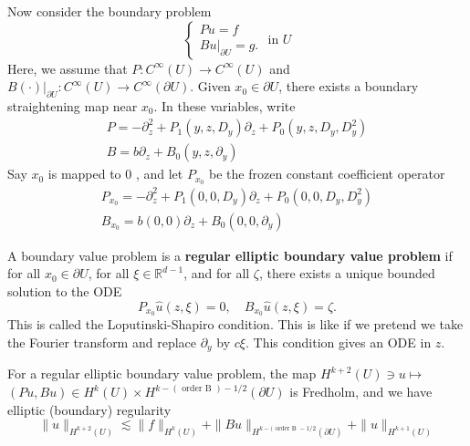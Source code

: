 Now consider the boundary problem
$$
\left\{\begin{array}{l}
P u=f \\
\left.B u\right|_{\partial U}=g .
\end{array} \text { in } U\right.
$$
Here, we assume that $P: C^{\infty}(U) \rightarrow C^{\infty}(U)$ and $\left.B(\cdot)\right|_{\partial U}: C^{\infty}(U) \rightarrow C^{\infty}(\partial U)$. Given $x_{0} \in \partial U$, there exists a boundary straightening map near $x_{0}$. In these variables, write
$$
\begin{gathered}
P=-\partial_{z}^{2}+P_{1}\left(y, z, D_{y}\right) \partial_{z}+P_{0}\left(y, z, D_{y}, D_{y}^{2}\right) \\
B=b \partial_{z}+B_{0}\left(y, z, \partial_{y}\right)
\end{gathered}
$$
Say $x_{0}$ is mapped to 0 , and let $P_{x_{0}}$ be the frozen constant coefficient operator
$$
\begin{gathered}
P_{x_{0}}=-\partial_{z}^{2}+P_{1}\left(0,0, D_{y}\right) \partial_{z}+P_{0}\left(0,0, D_{y}, D_{y}^{2}\right) \\
B_{x_{0}}=b(0,0) \partial_{z}+B_{0}\left(0,0, \partial_{y}\right)
\end{gathered}
$$


\begin{definition}
\label{def: Loputinski-Shapiro}
A boundary value problem is a\textbf{ regular elliptic boundary value problem} if for all $x_{0} \in \partial U$, for all $\xi \in \mathbb{R}^{d-1}$, and for all $\zeta$, there exists a unique bounded solution to the ODE
$$
P_{x_{0}} \widehat{u}(z, \xi)=0, \quad B_{x_{0}} \widehat{u}(z, \xi)=\zeta .
$$
This is called the Loputinski-Shapiro condition. This is like if we pretend we take the Fourier transform and replace $\partial_{y}$ by $c \xi$. This condition gives an ODE in $z$.
\end{definition}


\begin{theorem}
For a regular elliptic boundary value problem, the map $H^{k+2}(U) \ni u \mapsto$ $(P u, B u) \in H^{k}(U) \times H^{k-(\text { order B })-1 / 2}(\partial U)$ is Fredholm, and we have elliptic (boundary) regularity
$$
\|u\|_{H^{k+2}(U)} \lesssim\|f\|_{H^{k}(U)}+\|B u\|_{H^{k-(\text { order B }-1 / 2}(\partial U)}+\|u\|_{H^{k+1}(U)}
$$

\end{theorem}


